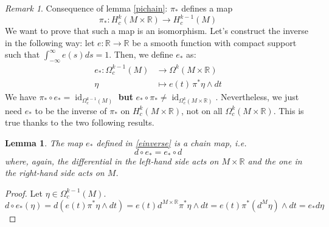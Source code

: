\documentclass[a4paper,11pt,titlepage, article, oneside]{memoir}
\numberwithin{equation}{section}
\newtheorem{lemma}[theorem]{Lemma}
\theoremstyle{definition}
\theoremstyle{remark}
\newtheorem{remark}[theorem]{Remark}
\DeclareMathOperator{\id}{id}
\newcommand{\rfield}{\mathbb{R}}
\begin{document}
\begin{remarkbox}
\begin{remark}
Consequence of lemma \ref{pichain}: $\pi_*$ defines a map
$$\pi_* \colon H_c^k(M \times \rfield) \rightarrow H^{k-1}_c(M)$$
We want to prove that such a map is an isomorphism. Let's construct the inverse in the following way: let $e \colon \rfield \rightarrow \rfield$ be a smooth function with compact support  such that $\int_{-\infty}^{\infty} e(s) ds = 1$. Then, we define $e_*$ as:
\begin{align} \label{einverse}
e_* \colon \Omega^{k-1}_c (M) &\rightarrow \Omega^k(M \times \rfield) \\
\eta &\mapsto e(t) \, \pi^*\eta \wedge dt \nonumber
\end{align}
We have $\pi_* \circ e_* = \id_{\Omega_c^{k-1}(M)}$ \textbf{but} $e_* \circ \pi_* \not = \id_{\Omega_c^k(M \times \rfield)}$. Nevertheless, we just need $e_*$ to be the inverse of $\pi_*$ on $H_c^k(M \times \rfield)$, not on all $\Omega^k_c(M \times \rfield)$. This is true thanks to the two following results.
\end{remark}
\end{remarkbox}

\begin{lemma}
The map $e_*$ defined in \eqref{einverse} is a chain map, i.e.
\begin{equation}
d \circ e_* = e_* \circ d
\end{equation}
where, again, the differential in the left-hand side acts on $M \times \rfield$ and the one in the right-hand side acts on $M$.
\end{lemma}
\begin{proof} 
Let $\eta \in \Omega^{k-1}_c(M)$.
\begin{equation*}
d \circ e_*(\eta) = d \left ( e(t)  \pi^*\eta \wedge dt \right ) = e(t) d^{M \times \rfield} \pi^*\eta \wedge dt = e(t) \pi^*(d^M \eta) \wedge dt = e_* d \eta
\end{equation*}
\end{proof}
\end{document}
